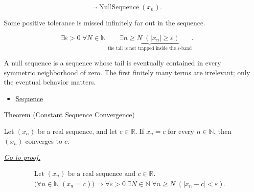 \begin{remark*}
\[
\neg\operatorname{NullSequence}(x_n).
\]
\end{remark*}

\begin{remark*}
Some positive tolerance is missed infinitely far out in the sequence.
\end{remark*}

\begin{remark*}
\[
\exists \varepsilon > 0\;
\forall N \in \mathbb{N}\;
\underbrace{\exists n \ge N\;(|x_n| \ge \varepsilon)}
_{\text{the tail is not trapped inside the } \varepsilon\text{-band}}.
\]
\end{remark*}

\begin{remark*}[Interpretation]
A null sequence is a sequence whose tail is eventually contained in every
symmetric neighborhood of zero. The first finitely many terms are irrelevant;
only the eventual behavior matters.
\end{remark*}

\begin{dependencies}
\begin{itemize}
  \item \hyperref[def:sequence]{Sequence}
\end{itemize}
\end{dependencies}


\begin{theorembox}{Theorem (Constant Sequence Convergence)}
\begin{theorem}
\label{thm:constant-sequence-convergence}
Let $(x_n)$ be a real sequence, and let $c \in \mathbb{R}$. If $x_n = c$
for every $n \in \mathbb{N}$, then $(x_n)$ converges to $c$.

\smallskip
\noindent
\hyperref[prf:constant-sequence-convergence]{\textit{Go to proof.}}
\end{theorem}
\end{theorembox}

\begin{remark*}
\[
\begin{aligned}
&\text{Let } (x_n) \text{ be a real sequence and } c \in \mathbb{R}.\\
&\bigl(\forall n \in \mathbb{N}\;(x_n = c)\bigr)
\Longrightarrow
\forall \varepsilon > 0\;
\exists N \in \mathbb{N}\;
\forall n \ge N\;(|x_n - c| < \varepsilon).
\end{aligned}
\]
\end{remark*}


